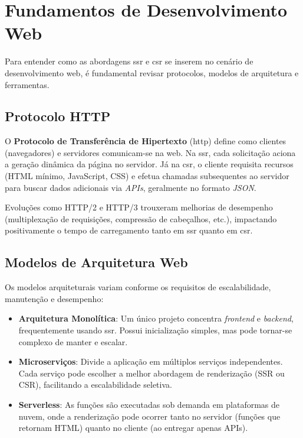 \section{Fundamentos de Desenvolvimento Web}
\label{sec:fundamentos-devweb}
Para entender como as abordagens \acrshort{ssr} e \acrshort{csr} se inserem no cenário de desenvolvimento web, é fundamental revisar protocolos, modelos de arquitetura e ferramentas.

\subsection{Protocolo HTTP}
\label{subsec:http}
O \textbf{Protocolo de Transferência de Hipertexto} (\acrshort{http}) define como clientes (navegadores) e servidores comunicam-se na web. Na \acrshort{ssr}, cada solicitação aciona a geração dinâmica da página no servidor. Já na \acrshort{csr}, o cliente requisita recursos (HTML mínimo, JavaScript, CSS) e efetua chamadas subsequentes ao servidor para buscar dados adicionais via \textit{APIs}, geralmente no formato \textit{JSON}.

Evoluções como HTTP/2 e HTTP/3 trouxeram melhorias de desempenho (multiplexação de requisições, compressão de cabeçalhos, etc.), impactando positivamente o tempo de carregamento tanto em \acrshort{ssr} quanto em \acrshort{csr}.

\subsection{Modelos de Arquitetura Web}
\label{subsec:modelos-arq-web}
Os modelos arquiteturais variam conforme os requisitos de escalabilidade, manutenção e desempenho:

\begin{itemize}
    \item \textbf{Arquitetura Monolítica}: Um único projeto concentra \textit{frontend} e \textit{backend}, frequentemente usando \acrshort{ssr}. Possui inicialização simples, mas pode tornar-se complexo de manter e escalar.
    \item \textbf{Microserviços}: Divide a aplicação em múltiplos serviços independentes. Cada serviço pode escolher a melhor abordagem de renderização (SSR ou CSR), facilitando a escalabilidade seletiva.
    \item \textbf{Serverless}: As funções são executadas sob demanda em plataformas de nuvem, onde a renderização pode ocorrer tanto no servidor (funções que retornam HTML) quanto no cliente (ao entregar apenas APIs).
\end{itemize}


